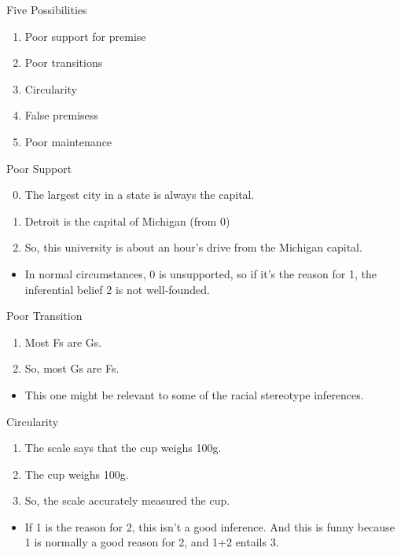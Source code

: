\documentclass[
  17pt,
  letterpaper,
  ignorenonframetext,
  aspectratio=169,
  handout,
  xcolor={dvipsnames}]{beamer}
\providecommand{\tightlist}{%
  \setlength{\itemsep}{0pt}\setlength{\parskip}{0pt}}\usepackage{longtable,booktabs,array}
\begin{document}
\begin{frame}{Five Possibilities}
\protect\hypertarget{five-possibilities}{}
\begin{enumerate}[<+->]
\tightlist
\item
  Poor support for premise
\item
  Poor transitions
\item
  Circularity
\item
  False premisess
\item
  Poor maintenance
\end{enumerate}
\end{frame}

\begin{frame}{Poor Support}
\protect\hypertarget{poor-support}{}
\begin{enumerate}[<+->]
\setcounter{enumi}{-1}
\tightlist
\item
  The largest city in a state is always the capital.
\item
  Detroit is the capital of Michigan (from 0)
\item
  So, this university is about an hour's drive from the Michigan
  capital.
\end{enumerate}

\begin{itemize}[<+->]
\tightlist
\item
  In normal circumstances, 0 is unsupported, so if it's the reason for
  1, the inferential belief 2 is not well-founded.
\end{itemize}
\end{frame}

\begin{frame}{Poor Transition}
\protect\hypertarget{poor-transition}{}
\begin{enumerate}[<+->]
\tightlist
\item
  Most Fs are Gs.
\item
  So, most Gs are Fs.
\end{enumerate}

\begin{itemize}[<+->]
\tightlist
\item
  This one might be relevant to some of the racial stereotype
  inferences.
\end{itemize}
\end{frame}

\begin{frame}{Circularity}
\protect\hypertarget{circularity}{}
\begin{enumerate}[<+->]
\tightlist
\item
  The scale says that the cup weighs 100g.
\item
  The cup weighs 100g.
\item
  So, the scale accurately measured the cup.
\end{enumerate}

\begin{itemize}[<+->]
\tightlist
\item
  If 1 is the reason for 2, this isn't a good inference. And this is
  funny because 1 is normally a good reason for 2, and 1+2 entails 3.
\end{itemize}
\end{frame}
\end{document}
